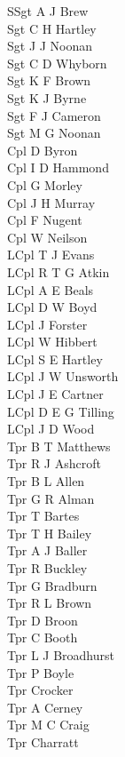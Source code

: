 \begin{multicols}{2}
  \noindent
  SSgt A J Brew \\
  Sgt C H Hartley \\
  Sgt J J Noonan \\
  Sgt C D Whyborn \\
  Sgt K F Brown \\
  Sgt K J Byrne \\
  Sgt F J Cameron \\
  Sgt M G Noonan \\
  Cpl D Byron \\
  Cpl I D Hammond \\
  Cpl G Morley \\
  Cpl J H Murray \\
  Cpl F Nugent \\
  Cpl W Neilson \\
  LCpl T J Evans \\
  LCpl R T G Atkin \\
  LCpl A E Beals \\
  LCpl D W Boyd \\
  LCpl J Forster \\
  LCpl W Hibbert \\
  LCpl S E Hartley \\
  LCpl J W Unsworth \\
  LCpl J E Cartner \\
  LCpl D E G Tilling \\
  LCpl J D Wood \\
  Tpr B T Matthews \\
  Tpr R J Ashcroft \\
  Tpr B L Allen \\
  Tpr G R Alman \\
  Tpr T Bartes \\
  Tpr T H Bailey \\
  Tpr A J Baller \\
  Tpr R Buckley \\
  Tpr G Bradburn \\
  Tpr R L Brown \\
  Tpr D Broon \\
  Tpr C Booth \\
  Tpr L J Broadhurst \\
  Tpr P Boyle \\
  Tpr Crocker \\
  Tpr A Cerney \\
  Tpr M C Craig \\
  Tpr Charratt \\

\end{multicols}

